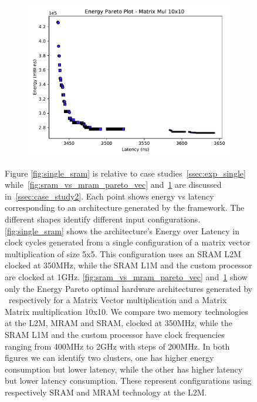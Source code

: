 \begin{figure}[ht]
\begin{subfigure}{.33\textwidth}
  \includegraphics[width=\textwidth]{graphs/EnergyParetoMatrixMul10.pdf}
  \caption{}
  \label{fig:sram_vs_mram_pareto_mul}
\end{subfigure}
    \caption{Figure \ref{fig:single_sram} is relative to case studies~\ref{ssec:exp_single} while~\ref{fig:sram_vs_mram_pareto_vec} and~\ref{fig:sram_vs_mram_pareto_mul} are discussed in~\ref{ssec:case_study2}. Each point shows energy vs latency corresponding to an architecture generated by the framework. The different shapes identify different input configurations. \ref{fig:single_sram} shows the architecture's Energy over Latency in clock cycles generated from a single configuration of a matrix vector multiplication of size 5x5. This configuration uses an SRAM L2M clocked at 350MHz, while the SRAM L1M and the custom processor are clocked at 1GHz. \ref{fig:sram_vs_mram_pareto_vec} and~\ref{fig:sram_vs_mram_pareto_mul} show only the Energy Pareto optimal hardware architectures generated by \frameworkname~respectively for a Matrix Vector multiplication and a Matrix Matrix multiplication 10x10. We compare two memory technologies at the L2M, MRAM and SRAM, clocked at 350MHz, while the SRAM L1M and the custom processor have clock frequencies ranging from 400MHz to 2GHz with steps of 200MHz. In both figures we can identify two clusters, one has higher energy consumption but lower latency, while the other has higher latency but lower latency consumption. These represent configurations using respectively SRAM and MRAM technology at the L2M.}
\label{fig:case_studies_1}
\end{figure}

